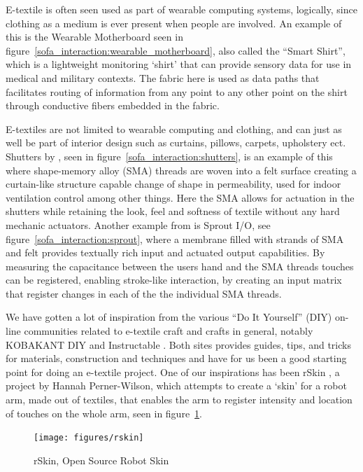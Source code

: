 E-textile is often seen used as part of wearable computing systems, logically, since clothing as a medium is ever present when people are involved.
An example of this is the Wearable Motherboard \citep{gopalsamy1999wearable} seen in figure~\ref{sofa_interaction:wearable_motherboard}, also called the ``Smart Shirt'', which is a lightweight monitoring `shirt' that can provide sensory data for use in medical and military contexts.
The fabric here is used as data paths that facilitates routing of information from any point to any other point on the shirt through conductive fibers embedded in the fabric.

E-textiles are not limited to wearable computing and clothing, and can just as well be part of interior design such as curtains, pillows, carpets, upholstery ect.
Shutters by \citet{coelho2009shutters}, seen in figure~\ref{sofa_interaction:shutters}, is an example of this where shape-memory alloy (SMA) threads are woven into a felt surface creating a curtain-like structure capable change of shape in permeability, used for indoor ventilation control among other things.
Here the SMA allows for actuation in the shutters while retaining the look, feel and softness of textile without any hard mechanic actuators.  
Another example from \citet{coelho2008sprout} is Sprout I/O, see figure~\ref{sofa_interaction:sprout}, where a membrane filled with strands of SMA and felt provides textually rich input and actuated output capabilities.
By measuring the capacitance between the users hand and the SMA threads touches can be registered, enabling stroke-like interaction, by creating an input matrix that register changes in each of the the individual SMA threads.

We have gotten a lot of inspiration from the various ``Do It Yourself'' (DIY) on-line communities related to e-textile craft and crafts in general, notably KOBAKANT DIY \citep{kobakantWEB} and Instructable \citep{instrucableWEB}.
Both sites provides guides, tips, and tricks for materials, construction and techniques and have for us been a good starting point for doing an e-textile project.
One of our inspirations has been rSkin \citep{rskinplusea,rSsininstructables}, a project by Hannah Perner-Wilson, which attempts to create a `skin' for a robot arm, made out of textiles, that enables the arm to register intensity and location of touches on the whole arm, seen in figure~\ref{rskin}.

\begin{figure}[hb]
	\centering
  		\texttt{[image: figures/rskin]}
	\caption[rSkin, Open Source Robot Skin]
   {rSkin, Open Source Robot Skin}
   \label{rskin}
\end{figure}

